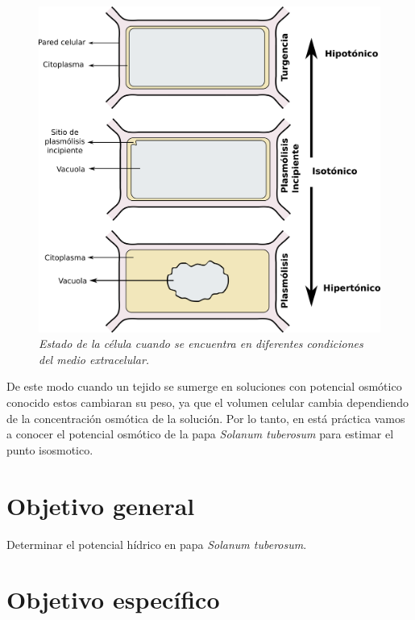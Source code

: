\begin{figure}[h]
	
	\begin{leftbar}
		
		\includegraphics[width=\textwidth]{Plasmolisis}
		\centering
		\caption{\textit{Estado de la c\'elula cuando se encuentra en diferentes condiciones del medio extracelular.}}
		\label{fig:pasmolisis}
		
	\end{leftbar}

\end{figure}

De este modo cuando un tejido se sumerge en soluciones con potencial osm\'otico conocido estos cambiaran su peso, ya que el volumen celular cambia dependiendo de la concentraci\'on osm\'otica de la soluci\'on. Por lo tanto, en est\'a pr\'actica vamos a conocer el potencial osm\'otico de la papa \textit{Solanum tuberosum} para estimar el punto isosmotico.


\section{Objetivo general}

Determinar el potencial h\'idrico en papa \textit{Solanum tuberosum}.

\section{Objetivo espec\'ifico}

